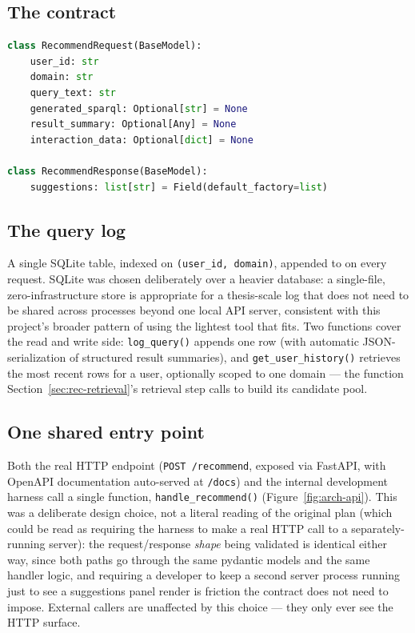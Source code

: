 \documentclass[11pt,a4paper,oneside]{book}
\newcommand{\code}[1]{\texttt{#1}}
\begin{document}
\subsection{The contract}

\begin{lstlisting}[language=Python, caption={The recommender's request/response contract. One
field, \code{interaction\_data}, is deliberately left untyped: its real shape depends on what the
external application actually logs per user, a dependency that was never confirmed during this
thesis (Section~\ref{sec:conclusion-limits}).}]
class RecommendRequest(BaseModel):
    user_id: str
    domain: str
    query_text: str
    generated_sparql: Optional[str] = None
    result_summary: Optional[Any] = None
    interaction_data: Optional[dict] = None

class RecommendResponse(BaseModel):
    suggestions: list[str] = Field(default_factory=list)
\end{lstlisting}

\subsection{The query log}

A single SQLite table, indexed on \code{(user\_id, domain)}, appended to on every request. SQLite
was chosen deliberately over a heavier database: a single-file, zero-infrastructure store is
appropriate for a thesis-scale log that does not need to be shared across processes beyond one
local API server, consistent with this project's broader pattern of using the lightest tool that
fits. Two functions cover the read and write side: \code{log\_query()} appends one row (with
automatic JSON-serialization of structured result summaries), and \code{get\_user\_history()}
retrieves the most recent rows for a user, optionally scoped to one domain --- the function
Section~\ref{sec:rec-retrieval}'s retrieval step calls to build its candidate pool.

\subsection{One shared entry point}

Both the real HTTP endpoint (\code{POST /recommend}, exposed via FastAPI, with OpenAPI
documentation auto-served at \code{/docs}) and the internal development harness call a single
function, \code{handle\_recommend()} (Figure~\ref{fig:arch-api}). This was a deliberate design
choice, not a literal reading of the original plan (which could be read as requiring the harness to
make a real HTTP call to a separately-running server): the request/response \emph{shape} being
validated is identical either way, since both paths go through the same pydantic models and the
same handler logic, and requiring a developer to keep a second server process running just to see a
suggestions panel render is friction the contract does not need to impose. External callers are
unaffected by this choice --- they only ever see the HTTP surface.
\end{document}
